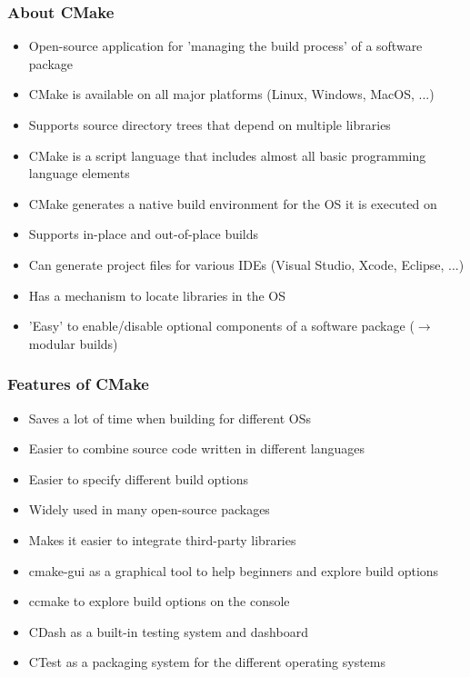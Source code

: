 
\begin{frame}
  \frametitle{About CMake}

        \begin{itemize}
          \item Open-source application for 'managing the build process' of a software package
          \item CMake is available on all major platforms (Linux, Windows, MacOS, ...) 
          \item Supports source directory trees that depend on multiple libraries
          \item CMake is a script language that includes almost all basic programming language elements
          \item CMake generates a native build environment for the OS it is executed on
          \item Supports in-place and out-of-place builds
          \item Can generate project files for various IDEs (Visual Studio, Xcode, Eclipse, ...)
          \item Has a mechanism to locate libraries in the OS
          \item 'Easy' to enable/disable optional components of a software package ($\rightarrow$ modular builds)
        \end{itemize}
\end{frame}

\begin{frame}
  \frametitle{Features of CMake}

        \begin{itemize}
          \item Saves a lot of time when building for different OSs 
          \item Easier to combine source code written in different languages 
          \item Easier to specify different build options 
          \item Widely used in many open-source packages
          \item Makes it easier to integrate third-party libraries
          \item cmake-gui as a graphical tool to help beginners and explore build options 
          \item ccmake to explore build options on the console 
          \item CDash as a built-in testing system and dashboard 
          \item CTest as a packaging system for the different operating systems 
        \end{itemize}

\end{frame}

